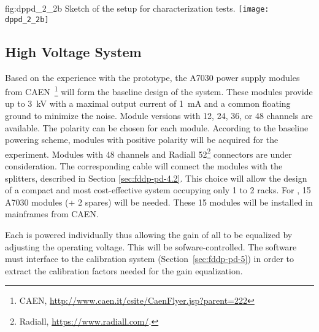 \begin{dunefigure}{fig:dppd_2_2b}
{Sketch of the setup for  characterization tests.}
\texttt{[image: dppd\_2\_2b]}
\end{dunefigure}

\subsection{High Voltage System}
\label{sec:fddp-pd-2.3}

Based on the experience with the  %
prototype, %
the A7030 power supply modules from CAEN~\footnote{CAEN\texttrademark{}, \url{http://www.caen.it/csite/CaenFlyer.jsp?parent=222}} 
will form the baseline design of the   system. 
These modules provide up to \SI{3}{kV} with a maximal output current of \SI{1}{mA} and a common floating ground to minimize the noise. Module versions with \num{12}, \num{24}, \num{36}, or \num{48}  channels are available. The  polarity can be chosen for each module. According to the baseline  powering scheme, modules with positive  polarity will be acquired for the experiment. Modules with \num{48}  channels and Radiall \num{52}\footnote{Radiall\texttrademark{}, \url{https://www.radiall.com/}.}  connectors are %
under consideration. The corresponding  cable will connect the modules with the  splitters, described in Section \ref{sec:fddp-pd-4.2}. This choice will allow the design of a compact and most cost-effective system occupying only %
\num{1} to \num{2} racks. %
For \dpnumpmtch {}, \num{15} A7030 modules (+ \num{2} spares) will be needed. These \num{15}  modules will be installed in mainframes from CAEN.

Each  is powered individually thus allowing the gain of all  to be equalized by adjusting the operating voltage. %
This will be sofware-controlled. The software must interface to the  calibration system (Section~\ref{sec:fddp-pd-5}) in order to extract the calibration factors needed for the gain equalization.

